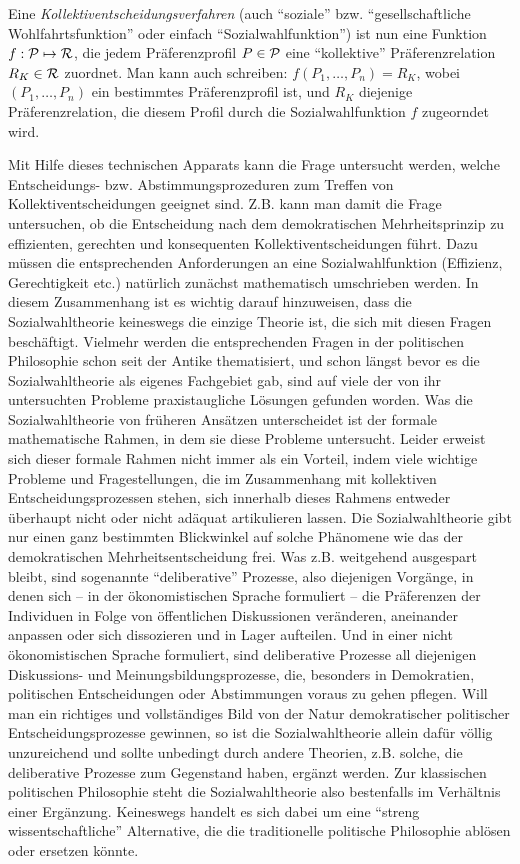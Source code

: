 Eine {\em Kollektiventscheidungsverfahren}
 (auch "`soziale"' bzw.
"`ge\-sell\-schaft\-liche Wohl\-fahrts\-funk\-tion"' oder einfach
"`Sozialwahlfunktion"') ist nun eine Funktion $f: {\cal P} \mapsto {\cal R}$,
die jedem Präferenzprofil $P \in {\cal P}$ eine "`kollektive"' Präferenzrelation
$R_K \in {\cal R}$ zuordnet. Man kann auch schreiben: $f(P_1,\ldots, P_n)
= R_K$, wobei $(P_1,\ldots, P_n)$ ein bestimmtes Präferenzprofil ist, und
$R_K$ diejenige Präferenzrelation, die diesem Profil durch die
Sozialwahlfunktion $f$ zugeorndet wird.

Mit Hilfe dieses technischen Apparats kann die Frage untersucht werden, welche
Entscheidungs- bzw. Abstimmungsprozeduren zum Treffen von Kollektiventscheidungen
geeignet sind. Z.B. kann man damit die Frage untersuchen, ob die Entscheidung
nach dem demokratischen Mehrheitsprinzip zu effizienten, gerechten und
konsequenten Kollektiventscheidungen führt. Dazu müssen die entsprechenden
Anforderungen an eine Sozialwahlfunktion (Effizienz, Gerechtigkeit etc.)
natürlich zunächst mathematisch umschrieben werden. In diesem Zusammenhang ist es
wichtig darauf hinzuweisen, dass die Sozialwahltheorie keineswegs die einzige
Theorie ist, die sich mit diesen Fragen beschäftigt. Vielmehr werden die
entsprechenden Fragen in der politischen Philosophie schon seit der Antike
thematisiert, und schon längst bevor es die Sozialwahltheorie als eigenes
Fachgebiet gab, sind auf viele der von ihr untersuchten Probleme praxistaugliche
Lösungen gefunden worden. Was die Sozialwahltheorie von früheren Ansätzen
unterscheidet ist der formale mathematische Rahmen, in dem sie diese Probleme
untersucht. Leider erweist sich dieser
formale Rahmen nicht immer als ein Vorteil, indem viele wichtige Probleme und
Fragestellungen, die im Zusammenhang mit kollektiven Entscheidungsprozessen
stehen, sich innerhalb dieses Rahmens entweder überhaupt nicht oder nicht adäquat
artikulieren lassen. Die Sozialwahltheorie gibt nur einen ganz bestimmten
Blickwinkel auf solche Phänomene wie das der demokratischen Mehrheitsentscheidung
frei. Was z.B. weitgehend ausgespart bleibt, sind sogenannte "`deliberative"'
Prozesse, also diejenigen Vorgänge, in denen sich -- in der ökonomistischen
Sprache formuliert -- die Präferenzen der Individuen in Folge von öffentlichen
Diskussionen veränderen, aneinander anpassen oder sich dissozieren und in Lager
aufteilen. Und in einer nicht ökonomistischen Sprache formuliert, sind
deliberative Prozesse all diejenigen Diskussions- und Meinungsbildungsprozesse,
die, besonders in Demokratien, politischen Entscheidungen oder Abstimmungen
voraus zu gehen pflegen. Will man ein richtiges und vollständiges Bild von der
Natur demokratischer politischer Entscheidungsprozesse gewinnen, so ist die
Sozialwahltheorie allein dafür völlig unzureichend und sollte unbedingt durch
andere Theorien, z.B. solche, die deliberative Prozesse zum Gegenstand haben,
ergänzt werden. Zur klassischen politischen Philosophie steht die
Sozialwahltheorie also bestenfalls im Verhältnis einer Ergänzung. Keineswegs
handelt es sich dabei um eine "`streng wissentschaftliche"' Alternative, die die
traditionelle politische Philosophie ablösen oder ersetzen könnte.


